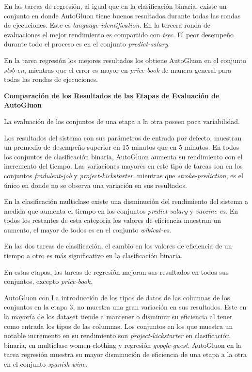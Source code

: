 En las tareas de regresión, al igual que en la clasificación binaria, existe un conjunto en donde AutoGluon tiene buenos resultados durante todas las rondas de ejecuciones.
Este es \textit{language-identification}. En la tercera ronda de evaluaciones el mejor rendimiento es compartido con \textit{trec}. El peor desempeño durante todo el 
proceso es en el conjunto \textit{predict-salary}.

En la tarea regresión los mejores resultados los obtiene AutoGluon en el conjunto \textit{stsb-en}, mientras que el error es mayor en \textit{price-book} de manera 
general para todas las rondas de ejecuciones.


\begin{flushleft} 
  {\large { \textbf{Comparación de los Resultados de las Etapas de Evaluación de AutoGluon}}}\label{results:comparation}
\end{flushleft}

La evaluación de los conjuntos de una etapa a la otra poseen poca variabilidad.  

Los resultados del sistema con sus parámetros de entrada por defecto, muestran un promedio de desempeño superior en 15 minutos que en 5 minutos. 
En todos los conjuntos de clasificación binaria, AutoGluon aumenta su rendimiento con el incremento del tiempo. 
Las variaciones mayores en este tipo de tareas son en los conjuntos \textit{fradulent-job} y \textit{project-kickstarter}, mientras que \textit{stroke-prediction}, 
es el único en donde no se observa una variación en sus resultados.

En la clasificación multiclase existe una disminución del rendimiento del sistema a medida que aumenta el tiempo en los conjuntos \textit{predict-salary} y 
\textit{vaccine-es}. En todos los restantes de esta categoría los valores de eficiencia muestran un aumento, el mayor de todos es en el conjunto \textit{wikicat-es}.

En las dos tareas de clasificación, el cambio en los valores de eficiencia de un tiempo a otro es más significativo en la clasificación binaria.

En estas etapas, las tareas de regresión  mejoran sus resultados en todos sus conjuntos, excepto \textit{price-book}.

AutoGluon con La introducción de los tipos de datos de las columnas de los conjuntos en la etapa 3, no muestra una gran variación en sus resultados.
Este en la mayoría de los dataset tiende a mantener o disminuir su eficiencia al tener como entrada los tipos de las columnas. Los conjuntos en los que muestra un 
notable incremento en su rendimiento son \textit{project-kickstarter} en clasificación binaria, en multiclase women-clothing y regresión 
\textit{google-guest}. AutoGluon en la tarea regresión muestra su mayor disminución de eficiencia de una etapa a la otra en el conjunto \textit{spanish-wine}.

